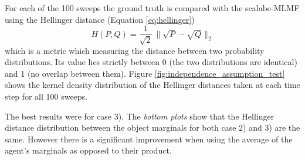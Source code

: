 For each of the 100 sweeps the ground truth is compared with the scalabe-MLMF using the 
Hellinger distance (Equation \ref{eq:hellinger})
\begin{equation} \label{eq:hellinger}
 H(P,Q) = \frac{1}{\sqrt{2}}\, \|\sqrt{P} - \sqrt{Q}\|_2  
\end{equation}
which is a metric which measuring the distance between two probability distributions. Its value lies strictly between 0 (the two 
distributions are identical) and 1 (no overlap between them). Figure \ref{fig:independence_assumption_test} shows the kernel density 
distribution of the Hellinger distances taken at each time step for all 100 sweeps.

The best results were for case 3). The \textit{bottom plots} show that the Hellinger distance distribution between the
object marginals for both case 2) and 3) are the same. However there is a significant improvement when using the average of 
the agent's marginals as opposed to their product. 

